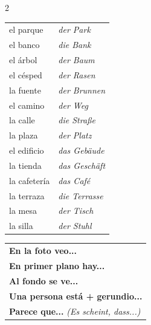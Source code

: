 \documentclass[10pt, a4paper]{article}
\newcommand{\es}[1]{\textbf{#1}}
\newcommand{\de}[1]{{\small\textit{\textcolor{mittelgrau}{#1}}}}
\begin{document}
\begin{multicols}{2}
\begin{vokabelbox}
{\small
\begin{tabular}{@{}ll@{}}
el parque & \de{der Park} \\
el banco & \de{die Bank} \\
el árbol & \de{der Baum} \\
el césped & \de{der Rasen} \\
la fuente & \de{der Brunnen} \\
el camino & \de{der Weg} \\
\midrule
la calle & \de{die Straße} \\
la plaza & \de{der Platz} \\
el edificio & \de{das Gebäude} \\
la tienda & \de{das Geschäft} \\
\midrule
la cafetería & \de{das Café} \\
la terraza & \de{die Terrasse} \\
la mesa & \de{der Tisch} \\
la silla & \de{der Stuhl} \\
\end{tabular}
}
\end{vokabelbox}

\vspace{6pt}

\begin{vokabelbox}[Redemittel]
{\small
\begin{tabular}{@{}l@{}}
\es{En la foto veo...} \\
\es{En primer plano hay...} \\
\es{Al fondo se ve...} \\
\es{Una persona está + gerundio...} \\
\es{Parece que...} \de{(Es scheint, dass...)} \\
\end{tabular}
}
\end{vokabelbox}

\end{multicols}


\vspace{4pt}
\end{document}
